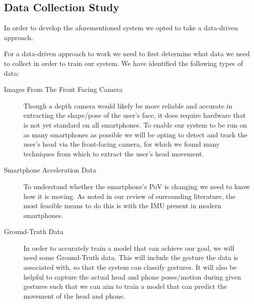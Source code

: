 \subsection{Data Collection Study} %


In order to develop the aforementioned system we opted to take a data-driven approach.

For a data-driven approach to work we need to first determine what data we need to collect in order to train our system. We have identified the following types of data:
\begin{description}
    \item[Images From The Front Facing Camera]\nl 
    Though a depth camera would likely be more reliable and accurate in extracting the shape/pose of the user's face, it does require hardware that is not yet standard on all smartphones. To enable our system to be run on as many smartphones as possible we will be opting to detect and track the user's head via the front-facing camera, for which we found many techniques from which to extract the user's head movement\cite{varona2008hands, lopez2012head, viola2004robust, kim2017real, neto2012real, francone2011using, yan2021fast}.
    \item[Smartphone Acceleration Data]\nl 
        To understand whether the smartphone's PoV is changing we need to know how it is moving. 
        As noted in our review of surrounding literature, the most feasible means to do this is with the IMU present in modern smartphones\cite{mantyla2000hand, kratz2013combining, neelasagar2015real, garcia2014contextualized}.
    \item[Ground-Truth Data]\nl 
        In order to accurately train a model that can achieve our goal, we will need some Ground-Truth data. This will include the gesture the data is associated with, so that the system can classify gestures. It will also be helpful to capture the actual head and phone poses/motion during given gestures such that we can aim to train a model that can predict the movement of the head and phone.
\end{description}

